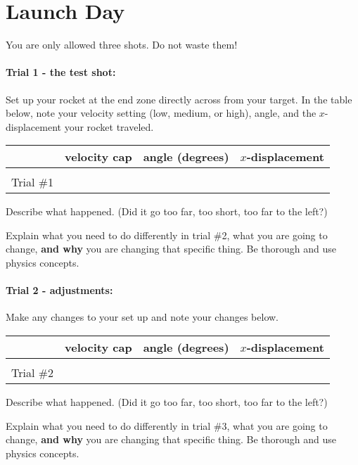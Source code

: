 \documentclass[10pt]{exam}
\begin{document}
\section*{Launch Day}

You are only allowed three shots.  Do not waste them!

\paragraph{Trial 1 - the test shot:}  Set up your rocket at the end zone directly across from your target.  In the table below, note your velocity setting (low, medium, or high), angle, and the $x$-displacement your rocket traveled.

\noindent
\begin{tabular}{|*4{l|}}
  \hline
  & velocity cap & angle (degrees) & $x$-displacement\\\hline
  &&& \\
  Trial \#1 &&& \\
  \hline
\end{tabular}

\noindent
Describe what happened. (Did it go too far, too short, too far to the left?)
\vspace{5em}

\noindent
Explain what you need to do differently in trial \#2, what you are going to change, {\bf and why} you are changing that specific thing.  Be thorough and use physics concepts.
\vspace{5em}


\paragraph{Trial 2 - adjustments:}  Make any changes to your set up and note your changes below.

\noindent
\begin{tabular}{|*4{l|}}
  \hline
  & velocity cap & angle (degrees) & $x$-displacement\\\hline
  &&& \\
  Trial \#2 &&& \\
  \hline
\end{tabular}

\noindent
Describe what happened. (Did it go too far, too short, too far to the left?)
\vspace{5em}

\noindent
Explain what you need to do differently in trial \#3, what you are going to change, {\bf and why} you are changing that specific thing.  Be thorough and use physics concepts.
\vspace{5em}
\end{document}
